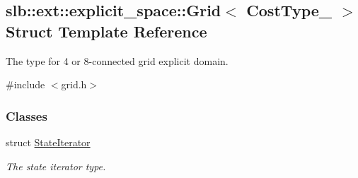 \hypertarget{structslb_1_1ext_1_1explicit__space_1_1Grid}{}\subsection{slb\+:\+:ext\+:\+:explicit\+\_\+space\+:\+:Grid$<$ Cost\+Type\+\_\+ $>$ Struct Template Reference}
\label{structslb_1_1ext_1_1explicit__space_1_1Grid}


The type for 4 or 8-\/connected grid explicit domain.  




{\ttfamily \#include $<$grid.\+h$>$}

\subsubsection*{Classes}
\begin{DoxyCompactItemize}
\item 
struct \hyperlink{structslb_1_1ext_1_1explicit__space_1_1Grid_1_1StateIterator}{State\+Iterator}
\begin{DoxyCompactList}\small\item\em The state iterator type. \end{DoxyCompactList}\end{DoxyCompactItemize}
